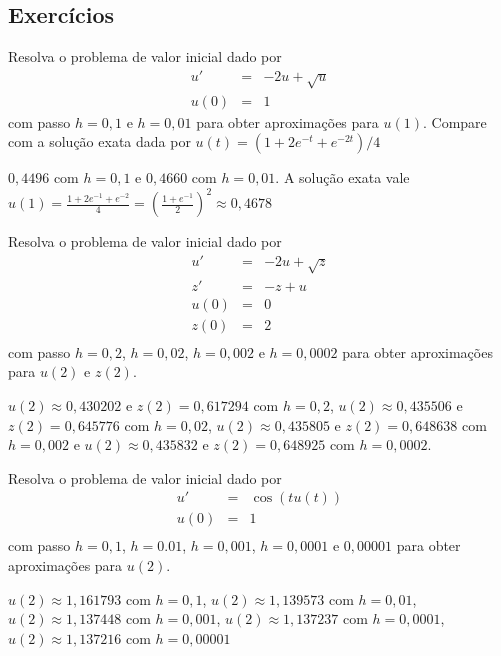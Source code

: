 \subsection*{Exercícios}
\begin{exer}Resolva o problema de valor inicial dado por
\begin{eqnarray*}
u'&=& -2u + \sqrt{u}\\
u(0)&=&1
\end{eqnarray*}
com passo $h=0,1$ e $h=0,01$ para obter aproximações para $u(1)$. Compare com a solução exata dada por $u(t) =  \left({1+2 e^{-t}+e^{-2 t}}\right)/{4}$
\end{exer}
\begin{resp}

 $0,4496$ com $h=0,1$ e $0,4660$ com $h=0,01$. A solução exata vale $u(1)=\frac{1+2e^{-1}+e^{-2}}{4}= \left(\frac{1+e^{-1}}{2}\right)^2\approx 0,4678$

\end{resp}


\begin{exer}Resolva o problema de valor inicial dado por
\begin{eqnarray*}
u'&=& -2u + \sqrt{z}\\
z'&=& -z + u\\
u(0)&=&0\\
z(0)&=&2\\
\end{eqnarray*}
com passo $h=0,2$, $h=0,02$, $h=0,002$ e $h=0,0002$ para obter aproximações para $u(2)$ e $z(2)$.
\end{exer}
\begin{resp}

$u(2)\approx 0,430202$ e $z(2)=0,617294$ com $h=0,2$,
$u(2)\approx 0,435506$ e $z(2)=0,645776$ com $h=0,02$,
$u(2)\approx 0,435805$ e $z(2)=0,648638$ com $h=0,002$ e
$u(2)\approx 0,435832$ e $z(2)=0,648925$ com $h=0,0002$.

\end{resp}

\begin{exer}Resolva o problema de valor inicial dado por
\begin{eqnarray*}
u'&=& \cos(tu(t))\\
u(0)&=&1\\
\end{eqnarray*}
com passo $h=0,1$, $h=0.01$, $h=0,001$, $h=0,0001$ e $0,00001$ para obter aproximações para $u(2)$.
\end{exer}
\begin{resp}

$u(2)\approx 1,161793$ com $h=0,1$,
$u(2)\approx 1,139573$ com $h=0,01$,
$u(2)\approx 1,137448$ com $h=0,001$,
$u(2)\approx 1,137237$ com $h=0,0001$,
$u(2)\approx 1,137216$ com $h=0,00001$
\end{resp}















